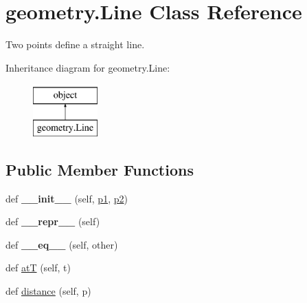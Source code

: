 \hypertarget{classgeometry_1_1Line}{}\section{geometry.\+Line Class Reference}
\label{classgeometry_1_1Line}


Two points define a straight line.  


Inheritance diagram for geometry.\+Line\+:\begin{figure}[H]
\begin{center}
\leavevmode
\includegraphics[height=2.000000cm]{classgeometry_1_1Line}
\end{center}
\end{figure}
\subsection*{Public Member Functions}
\begin{DoxyCompactItemize}
\item 
\mbox{\label{classgeometry_1_1Line_a0798ab42b8ca969cc6b686085642e023}} 
def {\bfseries \+\_\+\+\_\+init\+\_\+\+\_\+} (self, \hyperlink{classgeometry_1_1Line_aa46ea22a1b33099cbfa26a1646595a40}{p1}, \hyperlink{classgeometry_1_1Line_a10b5fbbd99ed5d63848a09e50a782cdf}{p2})
\item 
\mbox{\label{classgeometry_1_1Line_ac5887251dccbea9ec1fbab00dcfc42aa}} 
def {\bfseries \+\_\+\+\_\+repr\+\_\+\+\_\+} (self)
\item 
\mbox{\label{classgeometry_1_1Line_a0b21cc539996c6afb8f0fc1763d9d174}} 
def {\bfseries \+\_\+\+\_\+eq\+\_\+\+\_\+} (self, other)
\item 
def \hyperlink{classgeometry_1_1Line_a05b2f8b25c0025ba627523dc137f66cb}{atT} (self, t)
\item 
def \hyperlink{classgeometry_1_1Line_ac6b10e2377ad195ca3c2a6148b1aa770}{distance} (self, p)
\end{DoxyCompactItemize}
